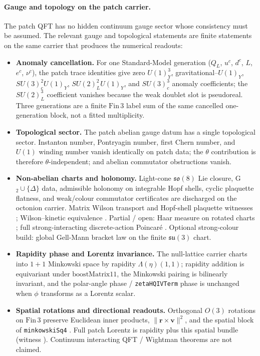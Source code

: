 \paragraph{Gauge and topology on the patch carrier.}
The patch QFT has no hidden continuum gauge sector whose consistency must be
assumed.  The relevant gauge and topological statements are finite statements on
the same carrier that produces the numerical readouts:
\ifdefined\patchBriefMode
\begin{itemize}[nosep]
\item \textbf{Anomaly cancellation.} For one Standard-Model generation
($Q_L$, $u^c$, $d^c$, $L$, $e^c$, $\nu^c$), the patch trace identities give
zero $U(1)_Y^3$, gravitational--$U(1)_Y$, $SU(3)_c^2U(1)_Y$,
$SU(2)_L^2U(1)_Y$, and $SU(3)_c^3$ anomaly coefficients; the $SU(2)_L^3$
coefficient vanishes because the weak doublet slot is pseudoreal.  Three
generations are a finite $\mathrm{Fin}\,3$ label sum of the same cancelled
one-generation block, not a fitted multiplicity\leanCertAnomaly.
\item \textbf{Topological sector.} The patch abelian gauge datum has a single
topological sector.  Instanton number, Pontryagin number, first Chern number, and
$U(1)$ winding number vanish identically on patch data; the $\theta$ contribution
is therefore $\theta$-independent; and abelian commutator obstructions vanish\leanCertTopology.
\item \textbf{Non-abelian charts and holonomy.} Light-cone $\mathfrak{so}(8)$ Lie
closure, G$_2\cup\{\Delta\}$ data, admissible holonomy on integrable Hopf shells,
cyclic plaquette flatness, and weak/colour commutator certificates are discharged on
the octonion carrier.  Matrix Wilson transport and Hopf-shell plaquette witnesses
\leanPatchHolonomyWitness; Wilson--kinetic equivalence
\leanPatchWilsonKinetic.  Partial / open: Haar measure on rotated charts
\leanPatchHaarMeasure; full strong-interacting discrete-action Poincaré
\leanPatchDiscretePoincare.  Optional strong-colour build: global Gell-Mann bracket
law on the finite $\mathfrak{su}(3)$ chart\leanCertStrongColor.
\item \textbf{Rapidity phase and Lorentz invariance.} The null-lattice carrier
charts into $1{+}1$ Minkowski space by rapidity $\Lambda(\eta)(1,1)$; rapidity
addition is equivariant under $\mathrm{boostMatrix11}$, the Minkowski pairing is
bilinearly invariant, and the polar-angle
\ifdefined\patchOmitZeta
phase
\else
/ \texttt{zetaHQIVTerm} phase
\fi
is unchanged
when $\phi$ transforms as a Lorentz scalar.
\item \textbf{Spatial rotations and directional readouts.} Orthogonal $O(3)$
rotations on $\mathrm{Fin}\,3$ preserve Euclidean inner products,
$\|{\mathbf r}\times{\mathbf v}\|^2$, and the spatial block of \texttt{minkowskiSq4}
\leanPatchSpatialRotation.  Full patch Lorentz is rapidity plus this spatial bundle
(witness ).  Continuum interacting QFT /
Wightman theorems are not claimed.
\end{itemize}
